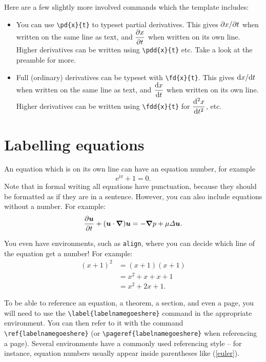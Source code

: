 \documentclass[12pt,a4paper,openany,twoside]{book}
\renewcommand{\v}[1]{\mathbfit{#1}}      %
\renewcommand{\d}{{\mathrm d}}
\def \p {\partial}
\newcommand{\vnabla}{\bm{\nabla}}
\newcommand{\Lap}{{\Delta}} %
\newcommand{\fd}[2]{\mathchoice{\frac{\d #1}{\d #2}}{\d #1/\d #2}{\d #1/\d #2}{\d #1/\d #2}}
\newcommand{\fdd}[2]{\mathchoice{\frac{\d^2 #1}{\d #2^2}}{\d^2 #1/\d #2^2}{\d^2 #1/\d #2^2}{\d^2 #1/\d #2^2}}
\newcommand{\pd}[2]{\mathchoice{\frac{\p #1}{\p #2}}{\p #1/\p #2}{\p #1/\p #2}{\p #1/\p #2}}
\newcommand{\pdd}[2]{\mathchoice{\frac{\p^2 #1}{\p #2^2}}{\p^2 #1/\p #2^2}{\p^2 #1/\p #2^2}{\p^2 #1/\p #2^2}}
\newcommand{\e}{\mathrm{e}}
\renewcommand{\i}{\mathrm{i}}
\begin{document}
Here are a few slightly more involved commands which the template includes:
\begin{itemize}
	\item You can use \verb|\pd{x}{t}| to typeset partial derivatives. This gives $\pd{x}{t}$ when written on the same line as text, and $\displaystyle\pd{x}{t}$ when written on its own line. Higher derivatives can be written using \verb|\pdd{x}{t}| etc. Take a look at the preamble for more.
	\item Full (ordinary) derivatives can be typeset with \verb|\fd{x}{t}|. This gives $\fd{x}{t}$ when written on the same line as text, and $\displaystyle\fd{x}{t}$ when written on its own line. Higher derivatives can be written using \verb|\fdd{x}{t}| for $\displaystyle\fdd{x}{t}$, etc.
\end{itemize}

\section{Labelling equations}
An equation which is on its own line can have an equation number, for example
\begin{equation}
	\e^{\i \pi} + 1 = 0.
	\label{euler}
\end{equation}
Note that in formal writing all equations have punctuation, because they should be formatted as if they are in a sentence. However, you can also include equations without a number. For example:
\begin{equation*}
	\pd{\v{u}}{t} + (\v{u}\cdot\vnabla)\v{u} = -\vnabla p + \mu \Lap \v{u}.
\end{equation*}

You even have environments, such as \texttt{align}, where you can decide which line of the equation get a number! For example:
\begin{align}
	(x+1)^2 &= (x+1)(x+1) \nonumber \\
	&= x^2 + x + x + 1 \nonumber \\
	&= x^2 + 2x + 1.
\end{align}

To be able to reference an equation, a theorem, a section, and even a page, you will need to use the \verb|\label{labelnamegoeshere}| command in the appropriate environment. You can then refer to it with the command \verb|\ref{labelnamegoeshere}| (or \verb|\pageref{labelnamegoeshere}| when referencing a page). Several environments have a commonly used referencing style -- for instance, equation numbers usually appear inside parentheses like (\ref{euler}). 
\end{document}
